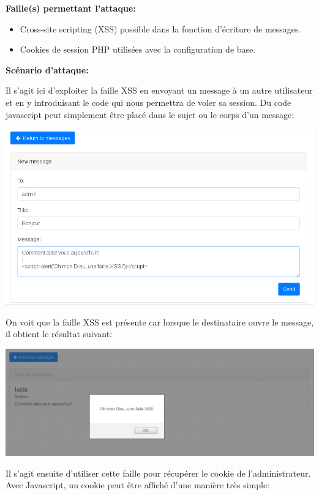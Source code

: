 \documentclass{article}
\begin{document}
\textbf{Faille(s) permettant l'attaque:}

\begin{itemize}

\item
  Cross-site scripting (XSS) possible dans la fonction d'écriture de
  messages.
\item
  Cookies de session PHP utilisées avec la configuration de base.
\end{itemize}

\textbf{Scénario d'attaque:}

Il s'agit ici d'exploiter la faille XSS en envoyant un message à un
autre utilisateur et en y introduisant le code qui nous permettra de
voler sa session. Du code javascript peut simplement être placé dans le
sujet ou le corps d'un message:

\includegraphics[width=\textwidth]{images/xss1.png}

On voit que la faille XSS est présente car lorsque le destinataire ouvre
le message, il obtient le résultat suivant:

\includegraphics[width=\textwidth]{images/xss2.png}

Il s'agit ensuite d'utiliser cette faille pour récupérer le cookie de
l'administrateur. Avec Javascript, un cookie peut être affiché d'une
manière très simple:
\end{document}
